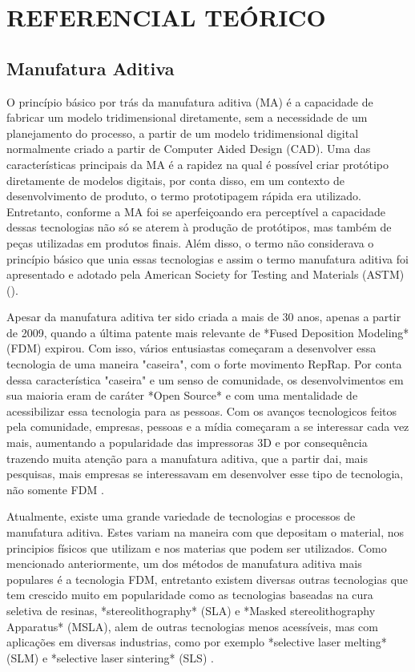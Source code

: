 \chapter{REFERENCIAL TEÓRICO}

\section{Manufatura Aditiva}
O princípio básico por trás da manufatura aditiva (MA) é a 
capacidade de fabricar um modelo tridimensional diretamente, 
sem a necessidade de um planejamento do processo, a partir de 
um modelo tridimensional digital normalmente criado a partir 
de Computer Aided Design (CAD). Uma das características 
principais da MA é a rapidez na qual é possível criar protótipo
diretamente de modelos digitais, por conta disso, em um contexto 
de desenvolvimento de produto, o termo prototipagem rápida era 
utilizado. Entretanto, conforme a MA foi se aperfeiçoando era 
perceptível a capacidade dessas tecnologias não só se aterem à 
produção de protótipos, mas também de peças utilizadas em 
produtos finais. Além disso, o termo não considerava o princípio 
básico que unia essas tecnologias e assim o termo manufatura 
aditiva foi apresentado e adotado pela American Society for 
Testing and Materials (ASTM) \citeauthor{gibson15} (\citeyear{gibson15}).

Apesar da manufatura aditiva ter sido criada a mais de 30 anos, apenas
a partir de 2009, quando a última patente mais relevante de *Fused Deposition Modeling* (FDM)
expirou. Com isso, vários entusiastas começaram a desenvolver essa tecnologia de uma
maneira "caseira", com o forte movimento RepRap. Por conta dessa característica
"caseira" e um senso de comunidade, os desenvolvimentos em sua maioria eram
de caráter *Open Source* e com uma mentalidade de acessibilizar essa tecnologia para as pessoas.
Com os avanços tecnologicos feitos pela comunidade, empresas, pessoas e a mídia começaram
a se interessar cada vez mais, aumentando a popularidade das impressoras 3D e por consequência
trazendo muita atenção para a manufatura aditiva, que a partir dai, mais pesquisas, mais
empresas se interessavam em desenvolver esse tipo de tecnologia, não somente FDM \cite{attaran17}.

Atualmente, existe uma grande variedade de tecnologias e processos de manufatura aditiva.
Estes variam na maneira com que depositam o material, nos principios físicos que utilizam e nos materias
que podem ser utilizados. Como mencionado anteriormente, um dos métodos de manufatura aditiva mais populares
é a tecnologia FDM, entretanto existem diversas outras tecnologias que tem crescido muito em popularidade
como as tecnologias baseadas na cura seletiva de resinas, *stereolithography* (SLA) e *Masked stereolithography Apparatus* (MSLA),
alem de outras tecnologias menos acessíveis, mas com aplicações em diversas industrias, como por exemplo
*selective laser melting* (SLM) e *selective laser
sintering* (SLS) \cite{bikas16}.  

